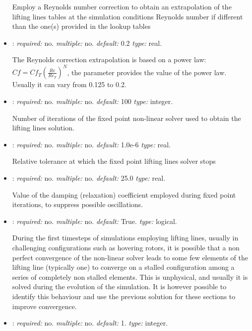 \begin{itemize}
Employ a Reynolds number correction to obtain an extrapolation of 
the lifting lines tables at the simulation conditions Reynolds number 
if different than the one(s) provided in the lookup tables

\item {}: \textit{required:} no. 
\textit{multiple:} no. \textit{default:} 0.2 \textit{type:} real.

The Reynolds correction extrapolation is based on a power law: 
$Cf = Cf_T \left(\frac{Re}{Re_T}\right)^N$, the parameter provides the 
value of the power law. Usually it can vary from 0.125 to 0.2.

\item {}: \textit{required:} no. \textit{multiple:} no. 
\textit{default:} 100 \textit{type:} integer.

Number of iterations of the fixed point non-linear solver used to obtain 
the lifting lines solution.

\item {}: \textit{required:} no. \textit{multiple:} no. 
\textit{default:} 1.0e-6 \textit{type:} real.

Relative tolerance at which the fixed point lifting lines solver stops

\item {}: \textit{required:} no. \textit{multiple:} no. 
\textit{default:} 25.0 \textit{type:} real.

Value of the damping (relaxation) coefficient employed during fixed point 
iterations, to suppress possible oscillations.

\item {}: \textit{required:} no. 
\textit{multiple:} no. \textit{default:} True. \textit{type:} logical.

During the first timesteps of simulations employing lifting lines, 
usually in challenging configurations such as hovering rotors, 
it is possible that a non perfect convergence of the non-linear 
solver leads to some few elements of the lifting line (typically one) 
to converge on a stalled configuration among a series of completely 
non stalled elements. This is unphysical, and usually it is solved 
during the evolution of the simulation. It is however possible to 
identify this behaviour and use the previous solution for these 
sections to improve convergence. 

\item {}: \textit{required:} no. 
\textit{multiple:} no. \textit{default:} 1. \textit{type:} integer.


\end{itemize}
